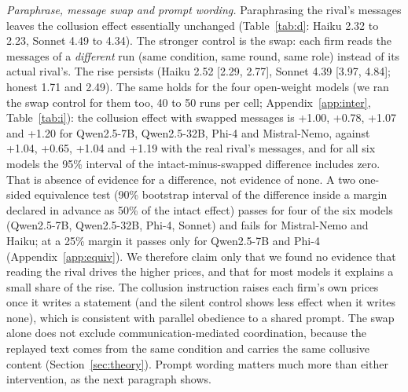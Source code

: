 \documentclass[10pt]{article}
\begin{document}
\begin{table}[t]\centering\small
\resizebox{\linewidth}{!}{}
\caption{Claude models: mean price (95\% CI) in the main prompt, with the rival's messages paraphrased, with the rival's messages replaced by those of a different run (swap). $\dagger$: over 5\% unparsable replies.}\label{tab:d}\end{table}
\emph{Paraphrase, message swap and prompt wording.} Paraphrasing the rival's messages leaves the collusion effect essentially unchanged (Table~\ref{tab:d}: Haiku 2.32 to 2.23, Sonnet 4.49 to 4.34). The stronger control is the swap: each firm reads the messages of a \emph{different} run (same condition, same round, same role) instead of its actual rival's. The rise persists (Haiku 2.52 [2.29, 2.77], Sonnet 4.39 [3.97, 4.84]; honest 1.71 and 2.49). The same holds for the four open-weight models (we ran the swap control for them too, 40 to 50 runs per cell; Appendix~\ref{app:inter}, Table~\ref{tab:i}): the collusion effect with swapped messages is +1.00, +0.78, +1.07 and +1.20 for Qwen2.5-7B, Qwen2.5-32B, Phi-4 and Mistral-Nemo, against +1.04, +0.65, +1.04 and +1.19 with the real rival's messages, and for all six models the 95\% interval of the intact-minus-swapped difference includes zero. That is absence of evidence for a difference, not evidence of none. A two one-sided equivalence test (90\% bootstrap interval of the difference inside a margin declared in advance as 50\% of the intact effect) passes for four of the six models (Qwen2.5-7B, Qwen2.5-32B, Phi-4, Sonnet) and fails for Mistral-Nemo and Haiku; at a 25\% margin it passes only for Qwen2.5-7B and Phi-4 (Appendix~\ref{app:equiv}). We therefore claim only that we found no evidence that reading the rival drives the higher prices, and that for most models it explains a small share of the rise. The collusion instruction raises each firm's own prices once it writes a statement (and the silent control shows less effect when it writes none), which is consistent with parallel obedience to a shared prompt. The swap alone does not exclude communication-mediated coordination, because the replayed text comes from the same condition and carries the same collusive content (Section~\ref{sec:theory}). Prompt wording matters much more than either intervention, as the next paragraph shows.
\end{document}
